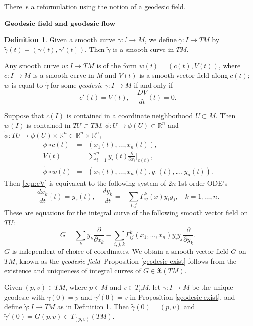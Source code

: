 \documentclass{amsart}
\numberwithin{equation}{section}
\newcommand{\bR}{\mathbb{R}}
\newcommand{\fX}{\mathfrak{X}}
\theoremstyle{definition}
\newtheorem{definition}{Definition} [section]
\theoremstyle{theorem}
\begin{document}
There is a reformulation using the notion of a geodesic field. 


\medskip

\noindent
{\bf \large Geodesic field and geodesic flow}

\begin{definition}\label{tgamma}
Given a smooth curve $\gamma:I\to M$, we define $\tilde{\gamma}:I\to TM$ by 
$\tilde{\gamma}(t)=(\gamma(t),\gamma'(t))$. Then $\tilde{\gamma}$ is a smooth curve in $TM$.
\end{definition} 

Any smooth curve $w:I\to TM$ is of the form $w(t)=(c(t),V(t))$, where $c:I\to M$ is 
a smooth curve in $M$ and $V(t)$ is a smooth vector field along $c(t)$; $w$ is
equal to $\tilde{\gamma}$ for some {\em geodesic} $\gamma:I\to M$ if and only if
\begin{equation}\label{eqn:cV}
c'(t)= V(t),\quad \frac{DV}{dt}(t)=0. 
\end{equation}

Suppose that $c(I)$ is contained in a coordinate neighborhood $U\subset M$. Then $w(I)$ is contained in $TU\subset TM$.
$\phi: U\to \phi(U)\subset \bR^n$ and $\tilde{\phi}: TU\to \phi(U)\times \bR^n \subset \bR^n\times \bR^n$, 
\begin{eqnarray*}
\phi\circ c(t) &=& (x_1(t),\ldots, x_n(t)),\\
V(t) &=& \sum_{i=1}^n y_i(t)\frac{\partial}{\partial x_i}|_{c(t)},\\
\tilde{\phi}\circ w(t) &=& (x_1(t),\ldots, x_n(t),y_1(t),\ldots, y_n(t)).
\end{eqnarray*}
Then \eqref{eqn:cV} is equivalent to the following system of $2n$ 1st order ODE's. 
\begin{equation} \label{eqn:cVxy}
\frac{dx_k}{dt}(t) = y_k(t),\quad \frac{dy_k}{dt} = - \sum_{i,j} \Gamma_{ij}^k(x) y_iy_j,\quad k=1,\ldots,n.
\end{equation}
These are equations for the integral curve of the following smooth vector field on $TU$: 
\[
G = \sum_{k} y_k \frac{\partial}{\partial x_k} - \sum_{i,j,k} \Gamma_{ij}^k(x_1,\ldots,x_n) y_iy_j \frac{\partial}{\partial y_k}.
\]
$G$ is independent of choice of coordinates. We obtain a smooth vector field $G$ on $TM$, known as the {\em geodesic field}.
Proposition \ref{geodesic-exist} follows from the existence and uniqueness of integral curves of $G\in \fX(TM)$.  

Given $(p,v)\in TM$, where $p\in M$ and $v\in T_pM$, let $\gamma:I\to M$ be the unique geodesic with
$\gamma(0)=p$ and $\gamma'(0)=v$ in Proposition \ref{geodesic-exist}, and define
$\tilde{\gamma}:I\to TM$ as in Definition \ref{tgamma}.
Then $\tilde{\gamma}(0)= (p,v)$ and $\tilde{\gamma}'(0)=G(p,v)\in T_{(p,v)}(TM)$.
\end{document}
